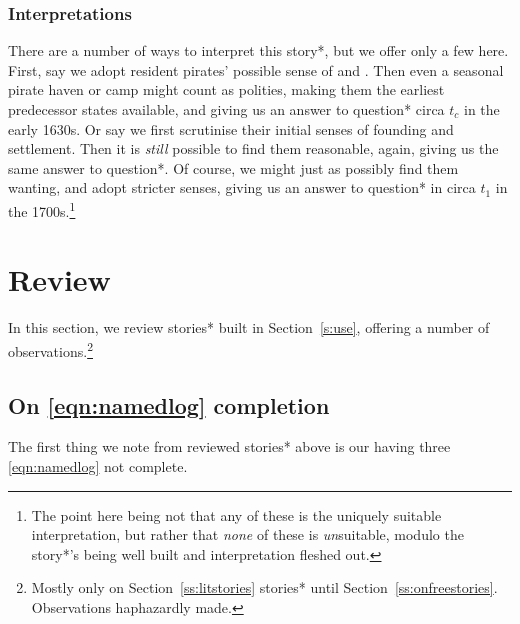 		\subsubsection{Interpretations}
		\label{sss:storyinterpret}
		There are a number of ways to interpret this story*, but we offer only a few here. First, say we adopt resident pirates' possible sense of  and . Then even a seasonal pirate haven or camp might count as polities, making them the earliest predecessor states available, and giving us an answer to question* circa \(t_c\) in the early 1630s. Or say we first scrutinise their initial senses of founding and settlement. Then it is \emph{still} possible to find them reasonable, again, giving us the same answer to question*. Of course, we might just as possibly find them wanting, and adopt stricter senses, giving us an answer to question* in circa \(t_1\) in the 1700s.\footnote{The point here being not that any of these is the uniquely suitable interpretation, but rather that \emph{none} of these is \emph{un}suitable, modulo the story*'s being well built and interpretation fleshed out.}
%
%
%
\section{Review}
\label{s:review}
	In this section, we review stories* built in Section~\ref{s:use}, offering a number of observations.\footnote{Mostly only on Section~\ref{ss:litstories} stories* until Section~\ref{ss:onfreestories}. Observations haphazardly made.}
	\subsection{On \ref{eqn:namedlog} completion}
	\label{ss:onnolog}
		The first thing we note from reviewed stories* above is our having three \ref{eqn:namedlog} not complete.
		
